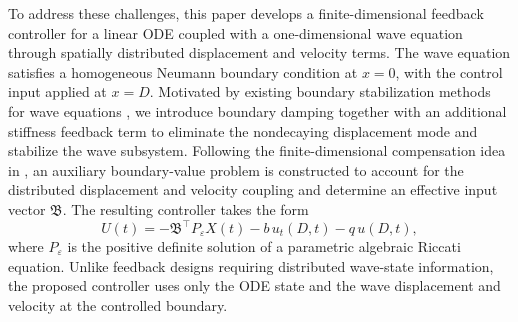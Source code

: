 \documentclass{IEEEtran}
\theoremstyle{definition}
\begin{document}
To address these challenges, this paper develops a finite-dimensional feedback controller for a linear ODE coupled with a one-dimensional wave equation through spatially distributed displacement and velocity terms. The wave equation satisfies a homogeneous Neumann boundary condition at $x=0$, with the control input applied at $x=D$. Motivated by existing boundary stabilization methods for wave equations \cite{krstic_output-feedback_2008,tsubakino_forwarding-based_2024}, we introduce boundary damping together with an additional stiffness feedback term to eliminate the nondecaying displacement mode and stabilize the wave subsystem. Following the finite-dimensional compensation idea in \cite{xu_low-gain_2023}, an auxiliary boundary-value problem is constructed to account for the distributed displacement and velocity coupling and determine an effective input vector $\mathfrak B$. The resulting controller takes the form
\begin{equation}
U(t)=-\mathfrak B^\top P_\varepsilon X(t)-b\,u_t(D,t)-q\,u(D,t),
\label{eq:introcontroller}
\end{equation}
where $P_\varepsilon$ is the positive definite solution of a parametric algebraic Riccati equation. Unlike feedback designs requiring distributed wave-state information, the proposed controller uses only the ODE state and the wave displacement and velocity at the controlled boundary.
\end{document}
